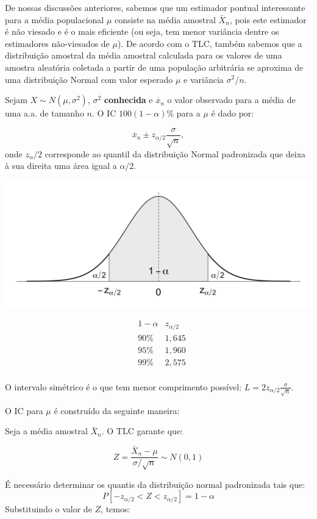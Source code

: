 \documentclass[
]{book}
\theoremstyle{definition}
\theoremstyle{definition}
\theoremstyle{definition}
\theoremstyle{remark}
\begin{document}
De nossas discussões anteriores, sabemos que um estimador pontual interessante para a média populacional \(\mu\) consiste na média amostral \(\bar{X}_n\), pois este estimador é não viesado e é o mais eficiente (ou seja, tem menor variância dentre os estimadores não-viesados de \(\mu\)). De acordo com o TLC, também sabemos que a distribuição amostral da média amostral calculada para os valores de uma amostra aleatória coletada a partir de uma população arbitrária se aproxima de uma distribuição Normal com valor esperado \(\mu\) e variância \(\sigma^2/n.\)

Sejam \(X \sim N(\mu, \sigma^2)\), \(\sigma^2\) \textbf{conhecida} e \(\overline{x}_n\) o valor observado para a média de uma a.a. de tamanho \(n\). O IC \(100(1-\alpha)\%\) para a \(\mu\) é dado por:

\[\overline{x}_n \pm z_{\alpha/2} \frac{\sigma}{\sqrt{n}},\]
onde \(z_\alpha/2\) corresponde ao quantil da distribuição Normal padronizada que deixa à sua direita uma área igual a \(\alpha/2\).

\includegraphics[width=1\linewidth]{img/IC-mean-norm-sigma}

\begin{align*}
&1-\alpha &z_{\alpha/2}\\
&90\%     &1,645\\
&95\%     &1,960\\
&99\%     &2,575\\
\end{align*}

O intervalo simétrico é o que tem menor comprimento possível: \(L = 2z_{\alpha/2} \frac{\sigma}{\sqrt{n}}\).

O IC para \(\mu\) é construído da seguinte maneira:

Seja a média amostral \(\bar{X}_n\). O TLC garante que:

\[Z = \frac{\bar{X}_n - \mu}{\sigma/\sqrt{n}} \sim N(0,1)\]

É necessário determinar os quantis da distribuição normal padronizada tais que:
\[P[-z_{\alpha/2} < Z < z_{\alpha/2}]  = 1-\alpha\]
Substituindo o valor de \(Z\), temos:
\end{document}
